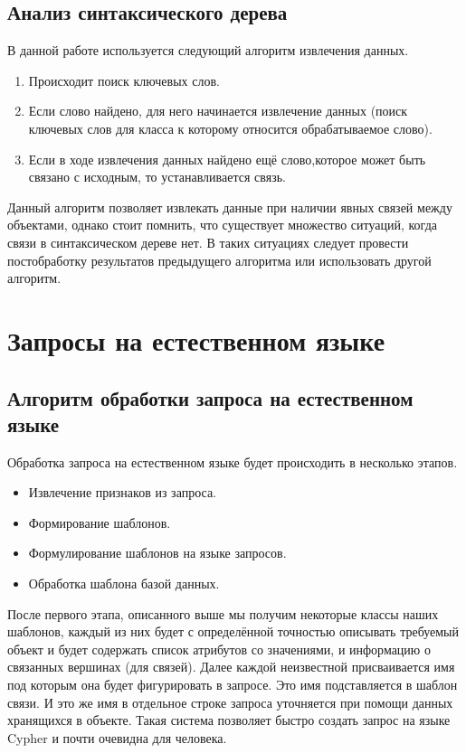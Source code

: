 \subsection{Анализ синтаксического дерева}
В данной работе используется следующий алгоритм извлечения данных. 
\begin{enumerate}
\item Происходит поиск ключевых слов.
\item Если слово найдено, для него начинается извлечение данных (поиск ключевых слов для класса к которому относится обрабатываемое слово).
\item Если в ходе извлечения данных найдено ещё слово,которое может быть связано с исходным, то устанавливается связь.
\end{enumerate}
Данный алгоритм позволяет извлекать данные при наличии явных связей между объектами, однако стоит помнить, что существует множество ситуаций, когда связи в синтаксическом дереве нет. В таких ситуациях следует провести постобработку результатов предыдущего алгоритма или использовать другой алгоритм.
\section{Запросы на естественном языке}
\subsection{Алгоритм обработки запроса на естественном языке}
Обработка запроса на естественном языке будет происходить в несколько этапов. 
\begin{itemize}
\item Извлечение признаков из запроса.
\item Формирование шаблонов.
\item Формулирование шаблонов на языке запросов.
\item Обработка шаблона базой данных.
\end{itemize}
После первого этапа, описанного выше мы получим некоторые классы наших шаблонов, каждый из них будет с определённой точностью описывать требуемый объект и будет содержать список атрибутов со значениями, и информацию о связанных вершинах (для связей). Далее каждой неизвестной присваивается имя под которым она будет фигурировать в запросе. Это имя подставляется в шаблон связи. И это же имя в отдельное строке запроса уточняется при помощи данных хранящихся в объекте. Такая система позволяет быстро создать запрос на языке Cypher и почти очевидна для человека.
